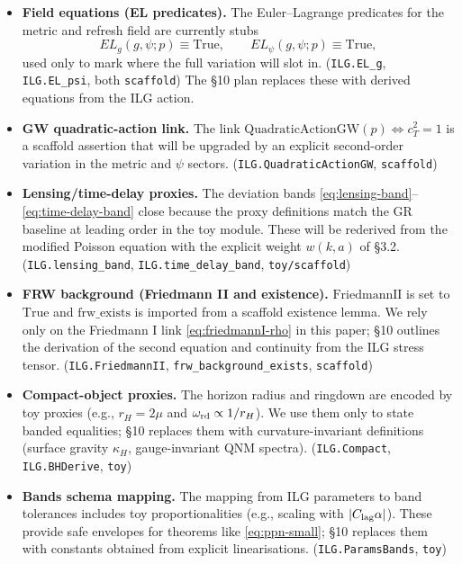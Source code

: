 \documentclass[12pt,a4paper]{article}
\begin{document}
\begin{itemize}
  \item \textbf{Field equations (EL predicates).} The Euler–Lagrange predicates for the metric and refresh field are currently stubs
  \[
    EL_g(g,\psi;p)\equiv \text{True},\qquad EL_\psi(g,\psi;p)\equiv \text{True},
  \]
  used only to mark where the full variation will slot in. (\texttt{ILG.EL\_g}, \texttt{ILG.EL\_psi}, both \texttt{scaffold}) The §10 plan replaces these with derived equations from the ILG action.
  \item \textbf{GW quadratic-action link.} The link \(\mathrm{QuadraticActionGW}(p)\iff c_T^2=1\) is a scaffold assertion that will be upgraded by an explicit second-order variation in the metric and \(\psi\) sectors. (\texttt{ILG.QuadraticActionGW}, \texttt{scaffold})
  \item \textbf{Lensing/time-delay proxies.} The deviation bands \eqref{eq:lensing-band}–\eqref{eq:time-delay-band} close because the proxy definitions match the GR baseline at leading order in the toy module. These will be rederived from the modified Poisson equation with the explicit weight \(w(k,a)\) of §3.2. (\texttt{ILG.lensing\_band}, \texttt{ILG.time\_delay\_band}, \texttt{toy/scaffold})
  \item \textbf{FRW background (Friedmann II and existence).} \(\mathrm{FriedmannII}\) is set to \(\text{True}\) and \(\mathrm{frw\_exists}\) is imported from a scaffold existence lemma. We rely only on the Friedmann I link \eqref{eq:friedmannI-rho} in this paper; §10 outlines the derivation of the second equation and continuity from the ILG stress tensor. (\texttt{ILG.FriedmannII}, \texttt{frw\_background\_exists}, \texttt{scaffold})
  \item \textbf{Compact-object proxies.} The horizon radius and ringdown are encoded by toy proxies (e.g., \(r_H=2\mu\) and \(\omega_{\rm rd}\propto 1/r_H\)). We use them only to state banded equalities; §10 replaces them with curvature-invariant definitions (surface gravity \(\kappa_H\), gauge-invariant QNM spectra). (\texttt{ILG.Compact}, \texttt{ILG.BHDerive}, \texttt{toy})
  \item \textbf{Bands schema mapping.} The mapping from ILG parameters to band tolerances includes toy proportionalities (e.g., scaling with \(|C_{\rm lag}\alpha|\)). These provide safe envelopes for theorems like \eqref{eq:ppn-small}; §10 replaces them with constants obtained from explicit linearisations. (\texttt{ILG.ParamsBands}, \texttt{toy})
\end{itemize}
\end{document}
